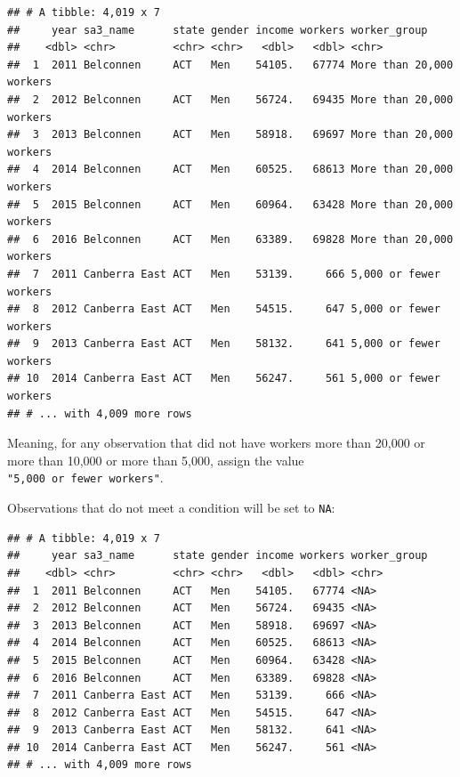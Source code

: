 \documentclass[]{book}
\newenvironment{Shaded}{\begin{snugshade}}{\end{snugshade}}
\newcommand{\DataTypeTok}[1]{\textcolor[rgb]{0.13,0.29,0.53}{#1}}
\newcommand{\FloatTok}[1]{\textcolor[rgb]{0.00,0.00,0.81}{#1}}
\newcommand{\KeywordTok}[1]{\textcolor[rgb]{0.13,0.29,0.53}{\textbf{#1}}}
\newcommand{\NormalTok}[1]{#1}
\newcommand{\OperatorTok}[1]{\textcolor[rgb]{0.81,0.36,0.00}{\textbf{#1}}}
\newcommand{\StringTok}[1]{\textcolor[rgb]{0.31,0.60,0.02}{#1}}
\begin{document}
\begin{verbatim}
## # A tibble: 4,019 x 7
##     year sa3_name      state gender income workers worker_group            
##    <dbl> <chr>         <chr> <chr>   <dbl>   <dbl> <chr>                   
##  1  2011 Belconnen     ACT   Men    54105.   67774 More than 20,000 workers
##  2  2012 Belconnen     ACT   Men    56724.   69435 More than 20,000 workers
##  3  2013 Belconnen     ACT   Men    58918.   69697 More than 20,000 workers
##  4  2014 Belconnen     ACT   Men    60525.   68613 More than 20,000 workers
##  5  2015 Belconnen     ACT   Men    60964.   63428 More than 20,000 workers
##  6  2016 Belconnen     ACT   Men    63389.   69828 More than 20,000 workers
##  7  2011 Canberra East ACT   Men    53139.     666 5,000 or fewer workers  
##  8  2012 Canberra East ACT   Men    54515.     647 5,000 or fewer workers  
##  9  2013 Canberra East ACT   Men    58132.     641 5,000 or fewer workers  
## 10  2014 Canberra East ACT   Men    56247.     561 5,000 or fewer workers  
## # ... with 4,009 more rows
\end{verbatim}

Meaning, for any observation that did not have workers more than 20,000 or more than 10,000 or more than 5,000, assign the value \texttt{"5,000\ or\ fewer\ workers"}.

Observations that do not meet a condition will be set to \texttt{NA}:

\begin{Shaded}
\end{Shaded}

\begin{verbatim}
## # A tibble: 4,019 x 7
##     year sa3_name      state gender income workers worker_group
##    <dbl> <chr>         <chr> <chr>   <dbl>   <dbl> <chr>       
##  1  2011 Belconnen     ACT   Men    54105.   67774 <NA>        
##  2  2012 Belconnen     ACT   Men    56724.   69435 <NA>        
##  3  2013 Belconnen     ACT   Men    58918.   69697 <NA>        
##  4  2014 Belconnen     ACT   Men    60525.   68613 <NA>        
##  5  2015 Belconnen     ACT   Men    60964.   63428 <NA>        
##  6  2016 Belconnen     ACT   Men    63389.   69828 <NA>        
##  7  2011 Canberra East ACT   Men    53139.     666 <NA>        
##  8  2012 Canberra East ACT   Men    54515.     647 <NA>        
##  9  2013 Canberra East ACT   Men    58132.     641 <NA>        
## 10  2014 Canberra East ACT   Men    56247.     561 <NA>        
## # ... with 4,009 more rows
\end{verbatim}
\end{document}
